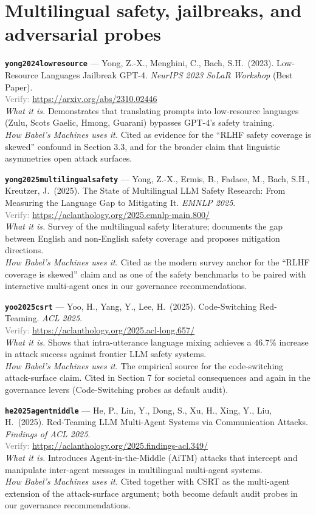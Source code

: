 \documentclass[11pt,a4paper]{article}
\newcommand{\entry}[5]{%
  \par\smallskip
  \noindent\textbf{\texttt{#1}} --- #2\\
  {\footnotesize \textcolor{gray}{Verify:} \url{#3}}\\
  \textit{What it is.} #4\\
  \textit{How Babel's Machines uses it.} #5
  \par\medskip
}
\begin{document}
\section{Multilingual safety, jailbreaks, and adversarial probes}

\entry{yong2024lowresource}
{Yong, Z.-X., Menghini, C., Bach, S.H.\ (2023). Low-Resource Languages Jailbreak GPT-4. \emph{NeurIPS 2023 SoLaR Workshop} (Best Paper).}
{https://arxiv.org/abs/2310.02446}
{Demonstrates that translating prompts into low-resource languages (Zulu, Scots Gaelic, Hmong, Guarani) bypasses GPT-4's safety training.}
{Cited as evidence for the ``RLHF safety coverage is skewed'' confound in Section 3.3, and for the broader claim that linguistic asymmetries open attack surfaces.}

\entry{yong2025multilingualsafety}
{Yong, Z.-X., Ermis, B., Fadaee, M., Bach, S.H., Kreutzer, J.\ (2025). The State of Multilingual LLM Safety Research: From Measuring the Language Gap to Mitigating It. \emph{EMNLP 2025}.}
{https://aclanthology.org/2025.emnlp-main.800/}
{Survey of the multilingual safety literature; documents the gap between English and non-English safety coverage and proposes mitigation directions.}
{Cited as the modern survey anchor for the ``RLHF coverage is skewed'' claim and as one of the safety benchmarks to be paired with interactive multi-agent ones in our governance recommendations.}

\entry{yoo2025csrt}
{Yoo, H., Yang, Y., Lee, H.\ (2025). Code-Switching Red-Teaming. \emph{ACL 2025}.}
{https://aclanthology.org/2025.acl-long.657/}
{Shows that intra-utterance language mixing achieves a $46.7\%$ increase in attack success against frontier LLM safety systems.}
{The empirical source for the code-switching attack-surface claim. Cited in Section 7 for societal consequences and again in the governance levers (Code-Switching probes as default audit).}

\entry{he2025agentmiddle}
{He, P., Lin, Y., Dong, S., Xu, H., Xing, Y., Liu, H.\ (2025). Red-Teaming LLM Multi-Agent Systems via Communication Attacks. \emph{Findings of ACL 2025}.}
{https://aclanthology.org/2025.findings-acl.349/}
{Introduces Agent-in-the-Middle (AiTM) attacks that intercept and manipulate inter-agent messages in multilingual multi-agent systems.}
{Cited together with CSRT as the multi-agent extension of the attack-surface argument; both become default audit probes in our governance recommendations.}
\end{document}
